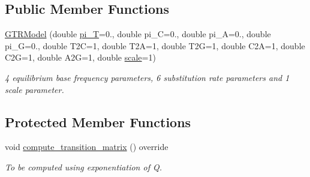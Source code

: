 \subsection*{Public Member Functions}
\begin{DoxyCompactItemize}
\item 
\mbox{\hyperlink{classrcombinator_1_1GTRModel_addd67a44caae9a477fc986d287dc2e8e}{G\+T\+R\+Model}} (double \mbox{\hyperlink{classrcombinator_1_1GTRModel_a1f58fe556a5ce9aaba6168c9f91e8372}{pi\+\_\+T}}=0., double pi\+\_\+C=0., double pi\+\_\+A=0., double pi\+\_\+G=0., double T2C=1, double T2A=1, double T2G=1, double C2A=1, double C2G=1, double A2G=1, double \mbox{\hyperlink{classrcombinator_1_1PointMutationModel_a328a30a438bb1b6a625faa3f714a85c8}{scale}}=1)
\begin{DoxyCompactList}\small\item\em 4 equilibrium base frequency parameters, 6 substitution rate parameters and 1 scale parameter. \end{DoxyCompactList}\end{DoxyCompactItemize}
\subsection*{Protected Member Functions}
\begin{DoxyCompactItemize}
\item 
\mbox{\label{classrcombinator_1_1GTRModel_a7d71f990fd33bcb7fc6a74accf03d7ae}} 
void \mbox{\hyperlink{classrcombinator_1_1GTRModel_a7d71f990fd33bcb7fc6a74accf03d7ae}{compute\+\_\+transition\+\_\+matrix}} () override
\begin{DoxyCompactList}\small\item\em To be computed using exponentiation of Q. \end{DoxyCompactList}\end{DoxyCompactItemize}
